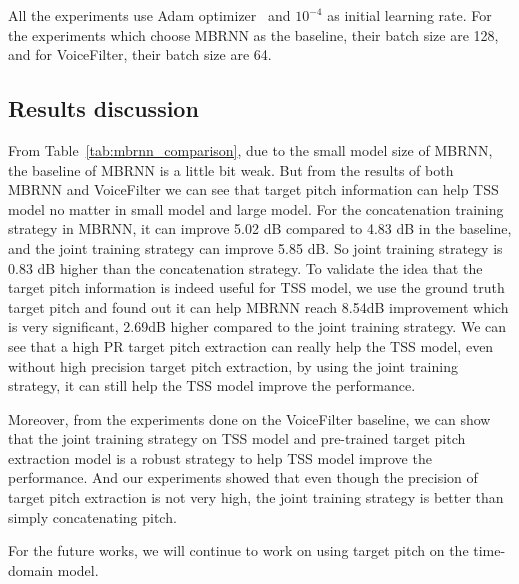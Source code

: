 \documentclass[
]{article}
\begin{document}
    All the experiments use Adam optimizer~\cite{kingma2017adam} and $10^{-4}$ as initial learning rate.
    For the experiments which choose MBRNN as the baseline, their batch size are 128, and for VoiceFilter, their batch size are 64.

    \subsection{Results discussion}
    \label{subsec:results_discussion}

    From Table~\ref{tab:mbrnn_comparison}, due to the small model size of MBRNN, the baseline of MBRNN is a little bit weak. But from the results of both MBRNN and VoiceFilter we can see that target pitch information can help TSS model no matter in small model and large model.
    For the concatenation training strategy in MBRNN, it can improve 5.02 dB compared to 4.83 dB in the baseline, and the joint training strategy can improve 5.85 dB. So joint training strategy is 0.83 dB higher than the concatenation strategy.
    To validate the idea that the target pitch information is indeed useful for TSS model, we use the ground truth target pitch and found out it can help MBRNN reach 8.54dB improvement which is very significant, 2.69dB higher compared to the joint training strategy.
    We can see that a high PR target pitch extraction can really help the TSS model, even without high precision target pitch extraction, by using the joint training strategy, it can still help the TSS model improve the performance.

    Moreover, from the experiments done on the VoiceFilter baseline, we can show that the joint training strategy on TSS model and pre-trained target pitch extraction model is a robust strategy to help TSS model improve the performance.
    And our experiments showed that even though the precision of target pitch extraction is not very high, the joint training strategy is better than simply concatenating pitch.

    For the future works, we will continue to work on using target pitch on the time-domain model.
\end{document}
